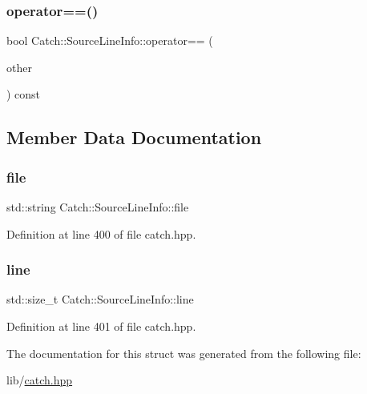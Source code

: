 \hypertarget{struct_catch_1_1_source_line_info_a688e761986879266658f000f14ab8a42}{}\label{struct_catch_1_1_source_line_info_a688e761986879266658f000f14ab8a42} 
\subsubsection{\texorpdfstring{operator==()}{operator==()}}
{\footnotesize\ttfamily bool Catch\+::\+Source\+Line\+Info\+::operator== (\begin{DoxyParamCaption}\item[{\hyperlink{struct_catch_1_1_source_line_info}{Source\+Line\+Info} const \&}]{other }\end{DoxyParamCaption}) const}



\subsection{Member Data Documentation}
\hypertarget{struct_catch_1_1_source_line_info_adf3ccf0c2bd326eb3466318af82a94dd}{}\label{struct_catch_1_1_source_line_info_adf3ccf0c2bd326eb3466318af82a94dd} 
\subsubsection{\texorpdfstring{file}{file}}
{\footnotesize\ttfamily std\+::string Catch\+::\+Source\+Line\+Info\+::file}



Definition at line 400 of file catch.\+hpp.

\hypertarget{struct_catch_1_1_source_line_info_a841e5d696c7b9cde24e45e61dd979c77}{}\label{struct_catch_1_1_source_line_info_a841e5d696c7b9cde24e45e61dd979c77} 
\subsubsection{\texorpdfstring{line}{line}}
{\footnotesize\ttfamily std\+::size\+\_\+t Catch\+::\+Source\+Line\+Info\+::line}



Definition at line 401 of file catch.\+hpp.



The documentation for this struct was generated from the following file\+:\begin{DoxyCompactItemize}
\item 
lib/\hyperlink{catch_8hpp}{catch.\+hpp}\end{DoxyCompactItemize}
